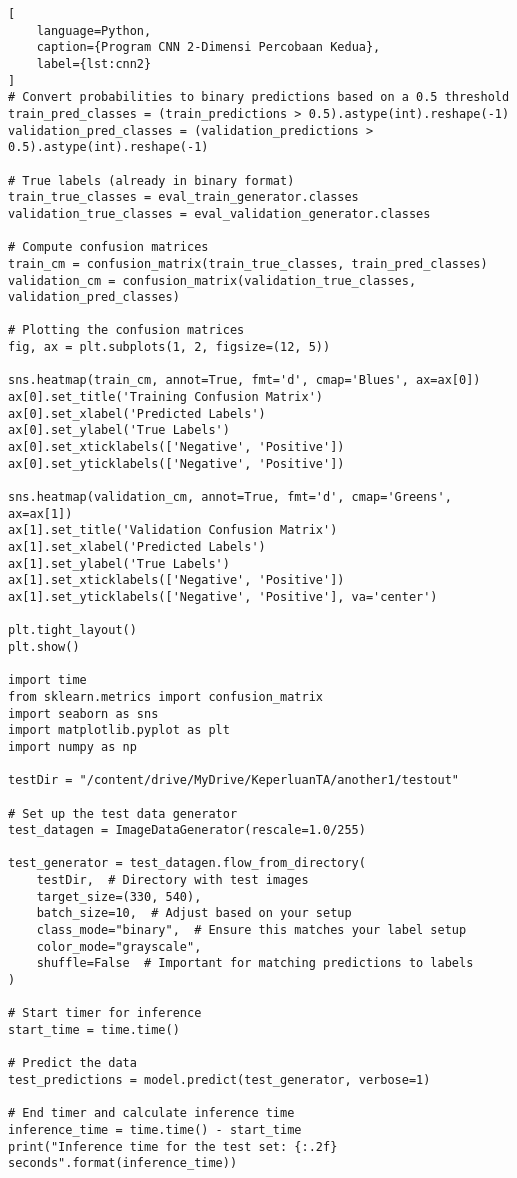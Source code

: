 \begin{lstlisting}[
    language=Python,
    caption={Program CNN 2-Dimensi Percobaan Kedua},
    label={lst:cnn2}
]
# Convert probabilities to binary predictions based on a 0.5 threshold
train_pred_classes = (train_predictions > 0.5).astype(int).reshape(-1)
validation_pred_classes = (validation_predictions > 0.5).astype(int).reshape(-1)

# True labels (already in binary format)
train_true_classes = eval_train_generator.classes
validation_true_classes = eval_validation_generator.classes

# Compute confusion matrices
train_cm = confusion_matrix(train_true_classes, train_pred_classes)
validation_cm = confusion_matrix(validation_true_classes, validation_pred_classes)

# Plotting the confusion matrices
fig, ax = plt.subplots(1, 2, figsize=(12, 5))

sns.heatmap(train_cm, annot=True, fmt='d', cmap='Blues', ax=ax[0])
ax[0].set_title('Training Confusion Matrix')
ax[0].set_xlabel('Predicted Labels')
ax[0].set_ylabel('True Labels')
ax[0].set_xticklabels(['Negative', 'Positive'])
ax[0].set_yticklabels(['Negative', 'Positive'])

sns.heatmap(validation_cm, annot=True, fmt='d', cmap='Greens', ax=ax[1])
ax[1].set_title('Validation Confusion Matrix')
ax[1].set_xlabel('Predicted Labels')
ax[1].set_ylabel('True Labels')
ax[1].set_xticklabels(['Negative', 'Positive'])
ax[1].set_yticklabels(['Negative', 'Positive'], va='center')

plt.tight_layout()
plt.show()

import time
from sklearn.metrics import confusion_matrix
import seaborn as sns
import matplotlib.pyplot as plt
import numpy as np

testDir = "/content/drive/MyDrive/KeperluanTA/another1/testout"

# Set up the test data generator
test_datagen = ImageDataGenerator(rescale=1.0/255)

test_generator = test_datagen.flow_from_directory(
    testDir,  # Directory with test images
    target_size=(330, 540),
    batch_size=10,  # Adjust based on your setup
    class_mode="binary",  # Ensure this matches your label setup
    color_mode="grayscale",
    shuffle=False  # Important for matching predictions to labels
)

# Start timer for inference
start_time = time.time()

# Predict the data
test_predictions = model.predict(test_generator, verbose=1)

# End timer and calculate inference time
inference_time = time.time() - start_time
print("Inference time for the test set: {:.2f} seconds".format(inference_time))


\end{lstlisting}
